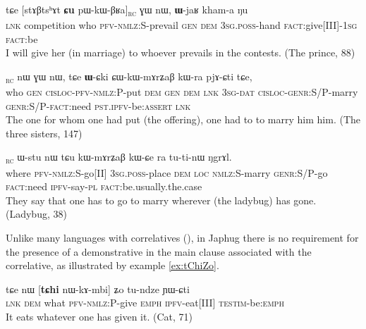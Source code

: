 \documentclass[oldfontcommands,oneside,a4paper,11pt]{article}
\newcommand{\ipa}[1]{{\phon #1}} %
\newcommand{\topic}{\textsc{dem}}
\newcommand{\rc}{\textsubscript{\textsc{rc}}}
\begin{document}
  \begin{exe}
\ex \label{ex:pWkWBRa}
\gll
\ipa{tɕe}  	[\ipa{stɤβtsʰɤt}  	\textbf{\ipa{ɕu}}   	\ipa{pɯ-kɯ-βʁa}]\rc{}  	\ipa{ɣɯ}  	\ipa{nɯ},  	\ipa{\textbf{ɯ}-jaʁ}  	\ipa{kham-a}  	\ipa{ŋu}  \\
\textsc{lnk}  competition who \textsc{pfv-nmlz:}S-prevail \textsc{gen} \textsc{dem} \textsc{3sg.poss}-hand \textsc{fact}:give[III]-\textsc{1sg} \textsc{fact}:be \\
\glt I will give her (in marriage) to whoever prevails in the contests.  (The prince, 88)
\end{exe}




\begin{exe}
\ex \label{ex:CthWkAta}
\gll
[\textbf{\ipa{ɕu}}   	\ipa{ɣɯ}  	\ipa{ɕ-tʰɯ-kɤ-ta}]\rc{}  	\ipa{nɯ}  	\ipa{ɣɯ}  	\ipa{nɯ,}  	\ipa{tɕe}  	\ipa{\textbf{ɯ}-ɕki}  	\ipa{ɕɯ-kɯ-mɤrʑaβ}  	\ipa{kɯ-ra}  	\ipa{pjɤ-ɕti}  	\ipa{tɕe,}  \\
who \textsc{gen} \textsc{cisloc-pfv-nmlz:P}-put \topic{} \textsc{gen} \topic{} \textsc{lnk}
\textsc{3sg}-\textsc{dat} \textsc{cisloc-genr:S/P}-marry \textsc{genr:S/P-fact}:need \textsc{pst.ipfv}-be:\textsc{assert} \textsc{lnk} \\
\glt The one for whom one had put (the offering), one had to to marry him him. (The three sisters, 147)
\end{exe} 


\begin{exe}
\ex \label{ex:jAkAri}
\gll
[\textbf{\ipa{ŋotɕu}}  	\ipa{jɤ-kɯ-ɤri}]\rc{} 	\ipa{ɯ-stu}  	\ipa{nɯ}  	\ipa{tɕu}  	\ipa{kɯ-mɤrʑaβ}  	\ipa{kɯ-ɕe}  	\ipa{ra}  	\ipa{tu-ti-nɯ}  	\ipa{ŋgrɤl.} \\
where \textsc{pfv-nmlz:S}-go[II] \textsc{3sg.poss}-place \topic{} \textsc{loc} \textsc{nmlz:S}-marry \textsc{genr:S/P}-go \textsc{fact}:need \textsc{ipfv}-say-\textsc{pl} \textsc{fact}:be.usually.the.case \\
\glt They say that one has to go to marry wherever (the ladybug) has gone. (Ladybug, 38)
\end{exe} 

Unlike many languages with correlatives   (\citealt{dayal96quantification}), in Japhug there is no requirement for the presence of a demonstrative  in the main clause  associated with the correlative, as illustrated by example  \ref{ex:tChiZo}.
 

\begin{exe}
\ex \label{ex:tChiZo}
\gll
\ipa{tɕe}  	\ipa{nɯ}  	[\textbf{\ipa{tɕhi}}  	\ipa{nɯ-kɤ-mbi}]  	\ipa{ʑo}  	\ipa{tu-ndze}  	\ipa{ɲɯ-ɕti}  \\
\textsc{lnk} \textsc{dem} what \textsc{pfv-nmlz:P}-give \textsc{emph} \textsc{ipfv}-eat[III] \textsc{testim}-be:\textsc{emph} \\
\glt It eats whatever one has given it. (Cat, 71)
\end{exe}
\end{document}
